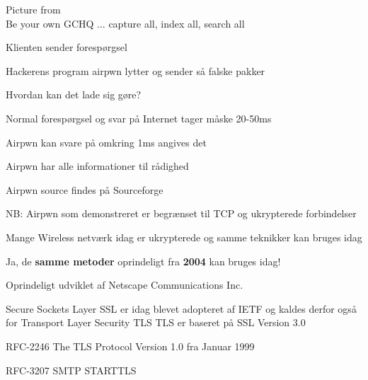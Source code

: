 \documentclass[Screen16to9,17pt]{foils}
\begin{document}


Picture from \\
Be your own GCHQ ... capture all, index all, search all









\begin{list1}
\item Klienten sender forespørgsel
\item Hackerens program airpwn lytter og sender så falske pakker
\item Hvordan kan det lade sig gøre?
\begin{list2}
\item Normal forespørgsel og svar på Internet tager måske 20-50ms
\item Airpwn kan svare på omkring 1ms angives det
\item Airpwn har alle informationer til rådighed
\end{list2}
\item Airpwn source findes på Sourceforge\\
\item NB: Airpwn som demonstreret er begrænset til TCP og ukrypterede
  forbindelser
\item Mange Wireless netværk idag er ukrypterede og samme teknikker kan bruges idag
\end{list1}

\centerline{Ja, de {\bf samme metoder} oprindeligt fra {\bf 2004} kan bruges idag!}







\begin{list1}
\item Oprindeligt udviklet af Netscape Communications Inc.
\item Secure Sockets Layer SSL er idag blevet adopteret af IETF og kaldes
derfor også for Transport Layer Security TLS
TLS er baseret på SSL Version 3.0
\item RFC-2246 The TLS Protocol Version 1.0 fra Januar 1999
\item RFC-3207 SMTP STARTTLS
\end{list1}
\end{document}

